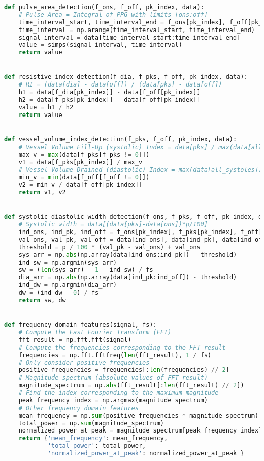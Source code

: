 \begin{lstlisting}[language=Python,label={lst:fe.py}, basicstyle=\scriptsize]
def pulse_area_detection(f_ons, f_off, pk_index, data):
    # Pulse Area = Integral of PPG with limits [ons:off]
    time_interval_start, time_interval_end = f_ons[pk_index], f_off[pk_index]
    time_interval = np.arange(time_interval_start, time_interval_end)
    signal_interval = data[time_interval_start:time_interval_end]
    value = simps(signal_interval, time_interval)
    return value


def resistive_index_detection(f_dia, f_pks, f_off, pk_index, data):
    # RI = (data[dia] - data[off]) / (data[pks] - data[off])
    h1 = data[f_dia[pk_index]] - data[f_off[pk_index]]
    h2 = data[f_pks[pk_index]] - data[f_off[pk_index]]
    value = h1 / h2
    return value


def vessel_volume_index_detection(f_pks, f_off, pk_index, data):
    # Vessel Volume Fill-Up (systolic) Index = data[pks] / max(data[all_systoles])
    max_v = max(data[f_pks[f_pks != 0]])
    v1 = data[f_pks[pk_index]] / max_v
    # Vessel Volume Drained (diastolic) Index = max(data[all_systoles]) / data[off]
    min_v = min(data[f_off[f_off != 0]])
    v2 = min_v / data[f_off[pk_index]]
    return v1, v2


def systolic_diastolic_width_detection(f_ons, f_pks, f_off, pk_index, data, fs, p):
    # Systolic width = data[(data[pks]-data[ons])*p/100]
    ind_ons, ind_pk, ind_off = f_ons[pk_index], f_pks[pk_index], f_off[pk_index]
    val_ons, val_pk, val_off = data[ind_ons], data[ind_pk], data[ind_off]
    threshold = p / 100 * (val_pk - val_ons) + val_ons
    sys_arr = np.abs(np.array(data[ind_ons:ind_pk]) - threshold)
    ind_sw = np.argmin(sys_arr)
    sw = (len(sys_arr) - 1 - ind_sw) / fs
    dia_arr = np.abs(np.array(data[ind_pk:ind_off]) - threshold)
    ind_dw = np.argmin(dia_arr)
    dw = (ind_dw - 0) / fs
    return sw, dw


def frequency_domain_features(signal, fs):
    # Compute the Fast Fourier Transform (FFT)
    fft_result = np.fft.fft(signal)
    # Compute the frequencies corresponding to the FFT result
    frequencies = np.fft.fftfreq(len(fft_result), 1 / fs)
    # Only consider positive frequencies
    positive_frequencies = frequencies[:len(frequencies) // 2]
    # Magnitude spectrum (absolute values of FFT result)
    magnitude_spectrum = np.abs(fft_result[:len(fft_result) // 2])
    # Find the index corresponding to the maximum magnitude
    peak_frequency_index = np.argmax(magnitude_spectrum)
    # Other frequency domain features
    mean_frequency = np.sum(positive_frequencies * magnitude_spectrum) / np.sum(magnitude_spectrum)
    total_power = np.sum(magnitude_spectrum)
    normalized_power_at_peak = magnitude_spectrum[peak_frequency_index] / total_power
    return {'mean_frequency': mean_frequency,
            'total_power': total_power,
            'normalized_power_at_peak': normalized_power_at_peak }
\end{lstlisting}

